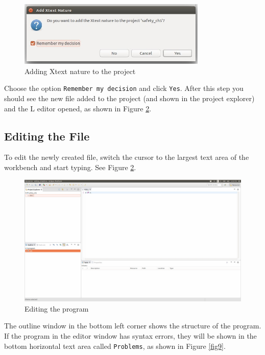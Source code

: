 \documentclass[a4paper,10pt]{article}
\begin{document}
\begin{figure}[h!]
\centering
\includegraphics[width=0.8\textwidth]{7}
\caption{Adding Xtext nature to the project}\label{fig7}
\end{figure}

\noindent
Choose the option \texttt{Remember my decision} and click \texttt{Yes}.
After this step you should see the new file added to the project (and shown in the project explorer) 
and the L editor opened, as shown in Figure \ref{fig8}.
\subsection{Editing the File}

To edit the newly created file, switch the cursor to the largest text area of the workbench and start typing. See Figure \ref{fig8}.
\begin{figure}[h!]
\centering
\includegraphics[width=1.0\textwidth]{8}
\caption{Editing the program}\label{fig8}
\end{figure}
The outline window in the bottom left corner shows the structure of the program.
If the program in the editor window has syntax errors, they will be shown in the bottom horizontal text area called \texttt{Problems}, as shown in Figure \ref{fig9}.
\end{document}
